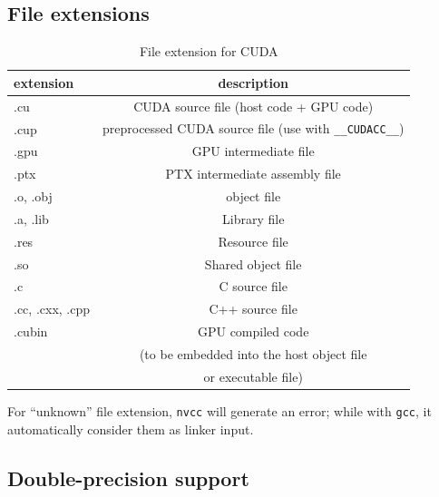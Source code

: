 \subsection{File extensions}
\label{sec:file-extensions}

\begin{table}[hbt]
\begin{center}
\caption{File extension for CUDA}
\begin{tabular}{l|c} 
\hline
extension & description \\ 
\hline\hline
.cu & CUDA source file (host code + GPU code) \\
.cup & preprocessed CUDA source file (use with \verb!__CUDACC__!) \\
.gpu & GPU intermediate file \\
.ptx & PTX intermediate assembly file \\
.o, .obj & object file \\
.a, .lib & Library file \\
.res & Resource file \\
.so & Shared object file \\
.c & C source file \\
.cc, .cxx, .cpp & C++ source file \\
.cubin & GPU compiled code \\
 & (to be embedded into the host object file \\
 & or executable file) \\
\hline\hline
\end{tabular}
\end{center}
\label{tab:cuda_fileextension}
\end{table}

For ``unknown'' file extension, \verb!nvcc! will generate an error;
while with \verb!gcc!, it automatically consider them as linker input.

\subsection{Double-precision support}
\label{sec:double-prec-supp}

